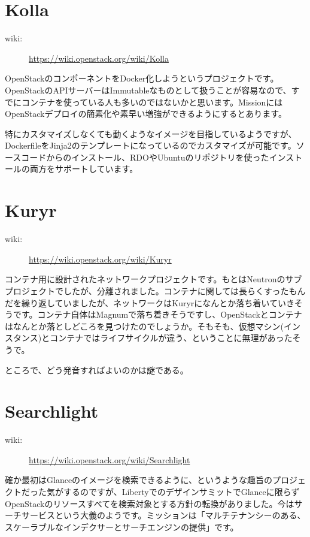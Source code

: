 \documentclass[10pt,b5paper,tombo,openany]{jsbook}
\begin{document}
\section{Kolla}
\begin{description}
	\item[wiki:] \url{https://wiki.openstack.org/wiki/Kolla}
\end{description}
OpenStackのコンポーネントをDocker化しようというプロジェクトです。OpenStackのAPIサーバーはImmutableなものとして扱うことが容易なので、すでにコンテナを使っている人も多いのではないかと思います。MissionにはOpenStackデプロイの簡素化や素早い増強ができるようにするとあります。

特にカスタマイズしなくても動くようなイメージを目指しているようですが、DockerfileをJinja2のテンプレートになっているのでカスタマイズが可能です。ソースコードからのインストール、RDOやUbuntuのリポジトリを使ったインストールの両方をサポートしています。

\section{Kuryr}
\begin{description}
	\item[wiki:] \url{https://wiki.openstack.org/wiki/Kuryr}
\end{description}
コンテナ用に設計されたネットワークプロジェクトです。もとはNeutronのサブプロジェクトでしたが、分離されました。コンテナに関しては長らくすったもんだを繰り返していましたが、ネットワークはKuryrになんとか落ち着いていきそうです。コンテナ自体はMagnumで落ち着きそうですし、OpenStackとコンテナはなんとか落としどころを見つけたのでしょうか。そもそも、仮想マシン(インスタンス)とコンテナではライフサイクルが違う、ということに無理があったそうで。

ところで、どう発音すればよいのかは謎である。

\section{Searchlight}
\begin{description}
	\item[wiki:] \url{https://wiki.openstack.org/wiki/Searchlight}
\end{description}
確か最初はGlanceのイメージを検索できるように、というような趣旨のプロジェクトだった気がするのですが、LibertyでのデザインサミットでGlanceに限らずOpenStackのリソースすべてを検索対象とする方針の転換がありました。今はサーチサービスという大義のようです。ミッションは「マルチテナンシーのある、スケーラブルなインデクサーとサーチエンジンの提供」です。
\end{document}
